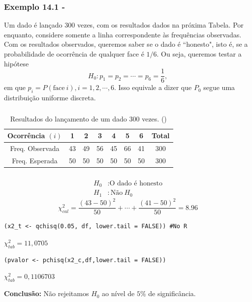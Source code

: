 \documentclass[14pt,aspectratio=1610]{beamer}
\newcommand{\Ho}{\ensuremath{H_{0}}}
\begin{document}
\begin{frame}{}
\frametitle{Exemplo 14.1 - \cite{Morettin09}}
\begin{block}{}
\justifying
Um dado é lançado $300$ vezes, com os resultados dados na próxima Tabela. Por enquanto, considere somente a linha correspondente às frequências observadas. Com os resultados observados, queremos saber se o dado é ``honesto", isto é, se a probabilidade
de ocorrência de qualquer face é $1/6.$ Ou seja, queremos testar a hipótese
$$\Ho: p_{1} = p_{2} = \cdots = p_{6} = \dfrac{1}{6},$$
em que $p_{i} = P(\textrm{face}\ i), i = 1, 2,\cdots, 6.$ Isso equivale a dizer que $P_{0}$ segue uma distribuição uniforme discreta.

\end{block}
\end{frame}

\begin{frame}{}
\frametitle{}
\begin{block}{}
\justifying
\begin{table}[]
\caption{Resultados do lançamento de um dado 300 vezes. (\cite{Morettin09})}
\begin{tabular}{c|cccccc|c}
\hline
Ocorrência $(i)$&1 &2 &3 &4 &5 &6 &Total\\
\hline
Freq. Observada &43&49&56&45&66&41&300\\
Freq. Esperada  &50&50&50&50&50&50&300\\
\hline
\end{tabular}
\end{table}
\end{block}
\end{frame}

\begin{frame}[fragile]{}
\frametitle{}
\vspace{-0.5cm}
\small
\begin{block}{}
\justifying
\begin{align*}
H_{0}&: \textrm{O dado é honesto} \\ 
H_{1}&: \textrm{Não}\ H_{0}
\end{align*}
$$\chi^{2}_{cal}=\dfrac{(43-50)^{2}}{50}+\cdots+\dfrac{(41-50)^{2}}{50}=8.96$$

\begin{verbatim}
(x2_t <- qchisq(0.05, df, lower.tail = FALSE)) #No R
\end{verbatim}
$\chi^{2}_{tab}=11,0705$


\begin{verbatim}
(pvalor <- pchisq(x2_c,df,lower.tail = FALSE))
\end{verbatim}
$\chi^{2}_{tab}=0,1106703$

{\bf Conclusão:} Não rejeitamos $H_{0}$ ao nível de $5\%$ de significância.
\end{block}
\end{frame}
\end{document}
